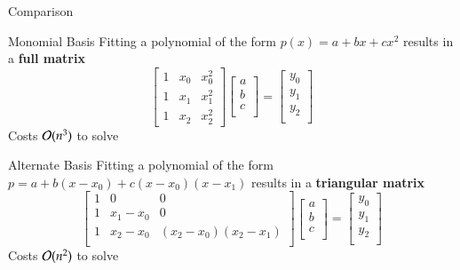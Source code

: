 \documentclass[10pt]{beamer}
\begin{document}
\begin{frame}{Comparison}

\begin{block}{Monomial Basis}
 Fitting a polynomial of the form   $p(x) = a + bx + cx^2$  
 results in a \textbf{full matrix}
$$
    \begin{bmatrix}
      1 & x_0 & x_0^2 \\
      1 & x_1 & x_1^2 \\
      1 & x_2 & x_2^2 
    \end{bmatrix}
    \begin{bmatrix}
      a\\
      b\\
      c\\
    \end{bmatrix}
     =
    \begin{bmatrix}
      y_0\\
      y_1\\
      y_2\\
    \end{bmatrix}
$$ 
Costs ${\mathcal{O}}(n^3)$ to solve
\end{block}


\begin{block}{Alternate Basis}
     Fitting a polynomial of the form   $ p = a + b(x-x_0) + c(x-x_0)(x-x_1)$  
 results in a \textbf{triangular matrix}
\begin{equation*}
  \begin{bmatrix}
    1 & 0 & 0\\
    1 & x_1 - x_0 & 0\\
    1 & x_2 - x_0 & (x_2-x_0)(x_2-x_1)\\
  \end{bmatrix}
  \begin{bmatrix}
    a\\ b\\ c\\
  \end{bmatrix} =
  \begin{bmatrix}
    y_0\\ y_1\\ y_2\\
  \end{bmatrix}
\end{equation*}
Costs ${\mathcal{O}}(n^2)$ to solve
\end{block}


\end{frame}
\end{document}

